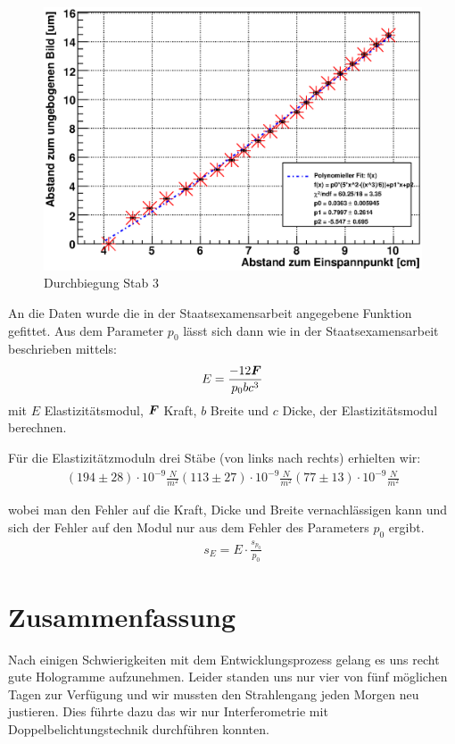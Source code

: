 \documentclass[12pt]{article}
\renewcommand*\vec[1]{{\mbox{\boldmath\ensuremath{#1}}}}
\begin{document}
\begin{figure}[H]
\centering
 \includegraphics[width=0.9\linewidth]{pictures/st3.eps}
 \caption{Durchbiegung Stab 3}
\end{figure}

An die Daten wurde die in der Staatsexamensarbeit angegebene Funktion gefittet. Aus dem Parameter $p_0$ lässt sich dann wie in der Staatsexamensarbeit
beschrieben mittels:
\begin{align*}
 E = \frac{-12 \vec F}{p_0 b c^3}
\end{align*}
mit $E$ Elastizitätsmodul, $\vec F$ Kraft, $b$ Breite und $c$ Dicke, der Elastizitätsmodul berechnen.

Für die Elastizitätzmoduln drei Stäbe (von links nach rechts) erhielten wir:
\begin{align*}
 (194 \pm 28) \cdot 10^{-9} \frac{N}{m^2}
 (113 \pm 27) \cdot 10^{-9} \frac{N}{m^2}
 (77  \pm 13) \cdot 10^{-9} \frac{N}{m^2}
\end{align*}

wobei man den Fehler auf die Kraft, Dicke und Breite vernachlässigen kann und sich der Fehler auf den Modul nur aus dem Fehler des Parameters $p_0$ ergibt.
\begin{align}
 s_E = E \cdot \frac{s_{p_0}}{p_0}
\end{align}



\section{Zusammenfassung}
Nach einigen Schwierigkeiten mit dem Entwicklungsprozess gelang es uns recht gute Hologramme aufzunehmen. Leider standen uns nur vier von fünf möglichen Tagen
zur Verfügung und wir mussten den Strahlengang jeden Morgen neu justieren. Dies führte dazu das wir nur Interferometrie mit Doppelbelichtungstechnik durchführen konnten.
 
\end{document}
